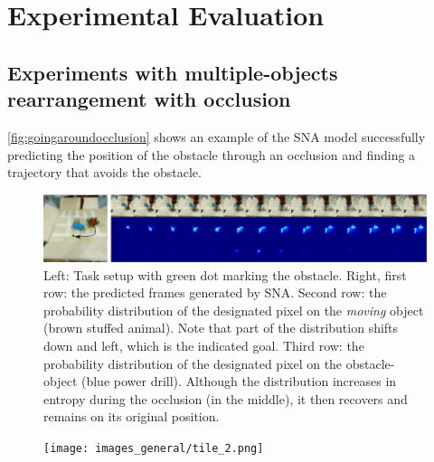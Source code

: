 \section{Experimental Evaluation}

\subsection{Experiments with multiple-objects rearrangement with occlusion}

 \autoref{fig:goingaroundocclusion} shows an example of the SNA model successfully predicting the position of the obstacle through an occlusion and finding a trajectory that avoids the obstacle. 

\begin{figure}
	\centering
	\includegraphics[width=1\linewidth]{images_sna/multiobject_qualitative/avoid_obstacle.pdf}
	\caption{Left: Task setup with green dot marking the obstacle. Right, first row: the predicted frames generated by SNA. Second row: the probability distribution of the designated pixel on the \textit{moving} object (brown stuffed animal). Note that part of the distribution shifts down and left, which is the indicated goal. Third row: the probability distribution of the designated pixel on the obstacle-object (blue power drill). Although the distribution increases in entropy during the occlusion (in the middle), it then recovers and remains on its original position.
		\label{fig:goingaroundocclusion}}
\end{figure}
\begin{figure}
	\centering
	\texttt{[image: images\_general/tile\_2.png]}
	\caption{
		\label{fig:tile_2}}
\end{figure}

